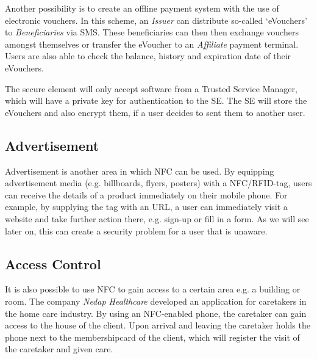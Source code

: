 Another possibility is to create an offline payment system with the use of electronic vouchers.
In this scheme, an \textit{Issuer} can distribute so-called `eVouchers' to \textit{Beneficiaries} via SMS.
These beneficiaries can then then exchange vouchers amongst themselves or transfer the eVoucher to an \textit{Affiliate} payment terminal.
Users are also able to check the balance, history and expiration date of their eVouchers. 

The secure element will only accept software from a Trusted Service Manager, which will have a private key for authentication to the SE.
The SE will store the eVouchers and also encrypt them, if a user decides to sent them to another user. \cite{1592613}


\subsection{Advertisement}
Advertisement is another area in which NFC can be used. By equipping advertisement media (e.g. billboards, flyers, posters) with a NFC/RFID-tag, users can receive the details of a product immediately on their mobile phone.
For example, by supplying the tag with an URL, a user can immediately visit a website and take further action there, e.g. sign-up or fill in a form.
As we will see later on, this can create a security problem for a user that is unaware. \cite{shannon2009profiling,mulliner2009vulnerability}

\subsection{Access Control}
It is also possible to use NFC to gain access to a certain area e.g. a building or room.
The company \textit{Nedap Healthcare} developed an application for caretakers in the home care industry.
By using an NFC-enabled phone, the caretaker can gain access to the house of the client.
Upon arrival and leaving the caretaker holds the phone next to the membershipcard of the client, which will register the visit of the caretaker and given care. \cite{Nedap2,Nedap1}

